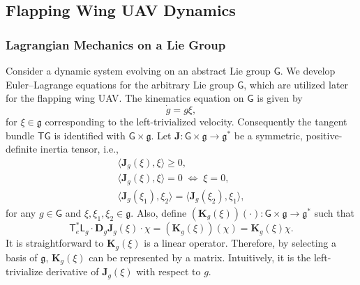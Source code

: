 \documentclass[10pt]{article}
\newcommand{\pair}[1]{\ensuremath{\langle #1 \rangle}}
\newcommand{\T}{\ensuremath{\mathsf{T}}}
\renewcommand{\L}{\ensuremath{\mathsf{L}}}
\newcommand{\D}{\ensuremath{\mathbf{D}}}
\newcommand{\G}{\ensuremath{\mathsf{G}}}
\newcommand{\g}{\ensuremath{\mathfrak{g}}}
\begin{document}
\clearpage\newpage

\subsection{Flapping Wing UAV Dynamics}

\subsubsection{Lagrangian Mechanics on a Lie Group}

Consider a dynamic system evolving on an abstract Lie group $\G$. 
We develop Euler--Lagrange equations for the arbitrary Lie group $\G$, which are utilized later for the flapping wing UAV. 
The kinematics equation on $\G$ is given by
\begin{equation}
    \dot g = g \xi,\label{eqn:dot_g}
\end{equation}
for $\xi\in\g$ corresponding to the left-trivialized velocity.
Consequently the tangent bundle $\T\G$ is identified with $\G\times \g$.
Let $\mathbf{J}:\G\times \g\rightarrow \g^*$ be a symmetric, positive-definite inertia tensor, i.e., 
\begin{gather*}
    \pair{\mathbf{J}_g(\xi), \xi} \geq 0,\\
    \pair{\mathbf{J}_g(\xi), \xi} = 0\; \Leftrightarrow \; \xi=0, \\ 
    \pair{\mathbf{J}_g(\xi_1), \xi_2} = \pair{\mathbf{J}_g(\xi_2), \xi_1},
\end{gather*}
for any $g\in\G$ and $\xi,\xi_1,\xi_2\in\g$. 
Also, define $(\mathbf{K}_g(\xi))(\cdot):\G\times \g\rightarrow \g^*$ such that
\begin{equation}
    \T_e^* \L_g \cdot \D_g \mathbf{J}_g(\xi) \cdot \chi = (\mathbf{K}_g(\xi)) (\chi) = \mathbf{K}_g(\xi)\chi. \label{eqn:KK}
\end{equation}
It is straightforward to $\mathbf{K}_g(\xi)$ is a linear operator.
Therefore, by selecting a basis of $\g$, $\mathbf{K}_g(\xi)$ can be represented by a matrix.
Intuitively, it is the left-trivialize derivative of $\mathbf{J}_g(\xi)$ with respect to $g$. 
\end{document}
